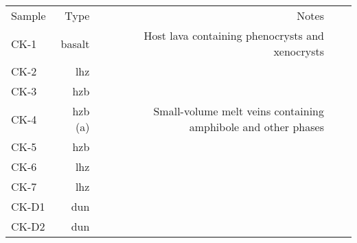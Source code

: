 \begin{tabular}{l r r r r}
\hline
  Sample & Type & Notes \\
  CK-1 & basalt & Host lava containing phenocrysts and xenocrysts \\
  CK-2 & lhz & \\
  CK-3 & hzb & \\
  CK-4 & hzb (a) & Small-volume melt veins containing amphibole and other phases \\
  CK-5 & hzb & \\
  CK-6 & lhz & \\
  CK-7 & lhz & \\
  CK-D1 & dun & \\
  CK-D2 & dun & \\
\hline
\end{tabular}
